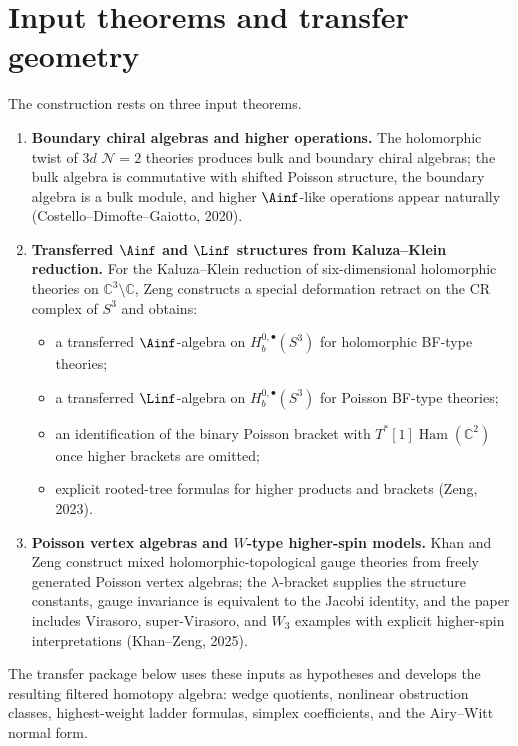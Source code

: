 \section{Input theorems and transfer geometry}

The construction rests on three input theorems.

\begin{enumerate}[label=\textbf{S\arabic*.},leftmargin=2.3em]
\item \textbf{Boundary chiral algebras and higher operations.}
The holomorphic twist of $3d$ $\mathcal N=2$ theories produces bulk and boundary chiral algebras; the bulk algebra is commutative with shifted Poisson structure, the boundary algebra is a bulk module, and higher $\Ainf$-like operations appear naturally (Costello--Dimofte--Gaiotto, 2020).

\item \textbf{Transferred $\Ainf$ and $\Linf$ structures from Kaluza--Klein reduction.}
For the Kaluza--Klein reduction of six-dimensional holomorphic theories on $\mathbb{C}^3\setminus \mathbb{C}$, Zeng constructs a special deformation retract on the CR complex of $S^3$ and obtains:
\begin{itemize}[leftmargin=1.8em]
\item a transferred $\Ainf$-algebra on $H_b^{0,\bullet}(S^3)$ for holomorphic BF-type theories;
\item a transferred $\Linf$-algebra on $H_b^{0,\bullet}(S^3)$ for Poisson BF-type theories;
\item an identification of the binary Poisson bracket with $T^*[1]\operatorname{Ham}(\mathbb{C}^2)$ once higher brackets are omitted;
\item explicit rooted-tree formulas for higher products and brackets (Zeng, 2023).
\end{itemize}

\item \textbf{Poisson vertex algebras and $W$-type higher-spin models.}
Khan and Zeng construct mixed holomorphic-topological gauge theories from freely generated Poisson vertex algebras; the $\lambda$-bracket supplies the structure constants, gauge invariance is equivalent to the Jacobi identity, and the paper includes Virasoro, super-Virasoro, and $W_3$ examples with explicit higher-spin interpretations (Khan--Zeng, 2025).
\end{enumerate}

The transfer package below uses these inputs as hypotheses and develops
the resulting filtered homotopy algebra: wedge quotients, nonlinear
obstruction classes, highest-weight ladder formulas, simplex
coefficients, and the Airy--Witt normal form.

